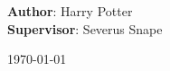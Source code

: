 \begin{titlepage}
	\large
	\textbf{Author}: Harry Potter\\
	\large
	\textbf{Supervisor}: Severus Snape
	
	\vspace{2cm}


    {\large \today}\\[1cm] %

    \vfill  %
    

\end{titlepage}

